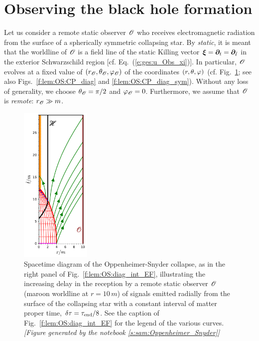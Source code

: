 

\section{Observing the black hole formation} \label{s:lem:obs}

Let us consider a remote static observer $\mathscr{O}$ who receives electromagnetic
radiation from the surface of a spherically symmetric collapsing star. By
\emph{static}, it is meant
that the worldline of $\mathscr{O}$ is a field line of the static Killing vector
$\bm{\xi} = \bm{\partial}_t = \bm{\partial}_{{\tilde t}}$ in the exterior Schwarzschild region
[cf. Eq.~(\ref{e:ges:u_Obs_xi})]. In particular, $\mathscr{O}$ evolves at a fixed
value of $(r_{\mathscr{O}},\theta_{\mathscr{O}},\varphi_{\mathscr{O}})$ of the coordinates $(r,\theta,\varphi)$
(cf. Fig.~\ref{f:lem:OS:diag_delay}; see also Figs.~\ref{f:lem:OS:CP_diag}
and \ref{f:lem:OS:CP_diag_sym}).
Without any loss of generality,
we choose $\theta_{\mathscr{O}} = \pi/2$ and $\varphi_{\mathscr{O}} = 0$.
Furthermore, we assume that $\mathscr{O}$ is \emph{remote}: $r_{\mathscr{O}} \gg m$.

\begin{figure}
\centerline{
\includegraphics[width=0.3\textwidth]{lem_OS_diag_delay.pdf}
}
\caption[]{\label{f:lem:OS:diag_delay} \footnotesize
Spacetime diagram of the Oppenheimer-Snyder collapse,
as in the right panel of Fig.~\ref{f:lem:OS:diag_int_EF}, illustrating
the increasing delay in the reception by a remote static observer $\mathscr{O}$
(maroon worldline at $r=10 \, m$)
of signals emitted radially from the
surface of the collapsing star with a constant interval of matter proper time,
$\delta\tau = \tau_{\rm end}/8$.
See the caption of Fig.~\ref{f:lem:OS:diag_int_EF} for the legend of the various
curves.
\textsl{[Figure generated by the notebook \ref{s:sam:Oppenheimer_Snyder}]}
}
\end{figure}

